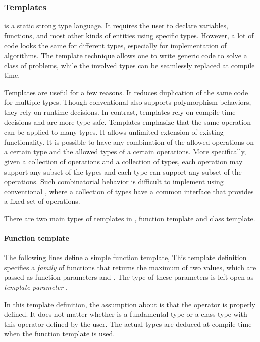 \subsubsection{Templates}
\label{ssub:Templates}

\cpp is a static strong type language. It requires the user to declare
variables, functions, and most other kinds of entities using specific types.
However, a lot of code looks the same for different types, especially for
implementation of algorithms. The \cpp template technique allows one to write
generic code to solve a class of problems, while the involved types can be
seamlessly replaced at compile time.

Templates are useful for a few reasons. It reduces duplication of the same
code for multiple types. Though conventional \oop also supports polymorphism
behaviors, they rely on runtime decisions. In contrast, templates rely on
compile time decisions and are more type safe. Templates emphasize that the
same operation can be applied to many types. It allows unlimited extension of
existing functionality. It is possible to have any combination of the allowed
operations on a certain type and the allowed types of a certain operations.
More specifically, given a collection of operations and a collection of types,
each operation may support any subset of the types and each type can support
any subset of the operations. Such combinatorial behavior is difficult to
implement using conventional \oop, where a collection of types have a common
interface that provides a fixed set of operations.

There are two main types of templates in \cpp, function template and class
template.

\paragraph{Function template}

The following lines define a simple function template,
This template definition specifies a \emph{family} of functions that returns
the maximum of two values, which are passed as function parameters
 and . The type of these parameters is left open as
\emph{template parameter} .

In this template definition, the assumption about  is that the
operator \cppinline{<} is properly defined. It does not matter whether
 is a fundamental type or a class type with this operator defined
by the user. The actual types are deduced at compile time when the function
template is used.

